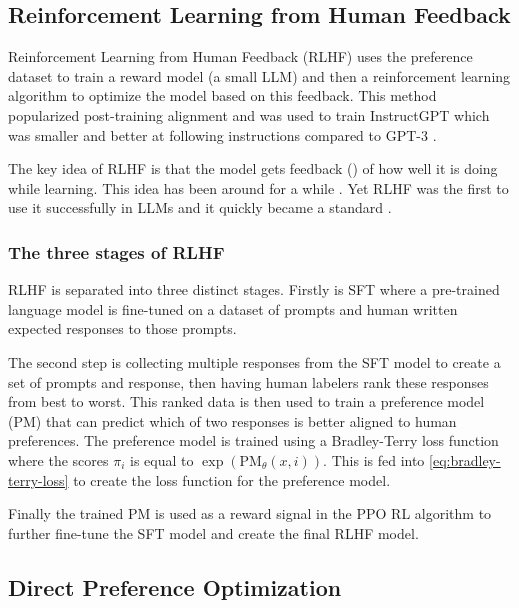 \subsection{Reinforcement Learning from Human Feedback}

Reinforcement Learning from Human Feedback (RLHF) \cite{ouyangTrainingLanguageModels2022} uses the preference dataset to train a reward model (a small LLM) and then a reinforcement learning algorithm to optimize the model based on this feedback. This method popularized post-training alignment and was used to train InstructGPT which was smaller and better at following instructions compared to GPT-3 \cite{brownLanguageModelsAre2020, ouyangTrainingLanguageModels2022}.

The key idea of RLHF is that the model gets feedback () of how well it is doing while learning. This idea has been around for a while \cite{christianoDeepReinforcementLearning2017}. Yet RLHF was the first to use it successfully in LLMs and it quickly became a standard \cite{team2023gemini,baiQwenTechnicalReport2023,shaoDeepSeekMathPushingLimits2024}.

\subsubsection{The three stages of RLHF}

RLHF is separated into three distinct stages. Firstly is SFT where a pre-trained language model is fine-tuned on a dataset of prompts and human written expected responses to those prompts.

The second step is collecting multiple responses from the SFT model to create a set of prompts and response, then having human labelers rank these responses from best to worst. This ranked data is then used to train a preference model (PM) that can predict which of two responses is better aligned to human preferences. The preference model is trained using a Bradley-Terry loss function where the scores $\pi_i$ is equal to $\exp(\text{PM}_\theta(x, i))$. This is fed into \ref{eq:bradley-terry-loss} to create the loss function for the preference model.

Finally the trained PM is used as a reward signal in the PPO \cite{schulmanProximalPolicyOptimization2017} RL algorithm to further fine-tune the SFT model and create the final RLHF model.

\subsection{Direct Preference Optimization}

